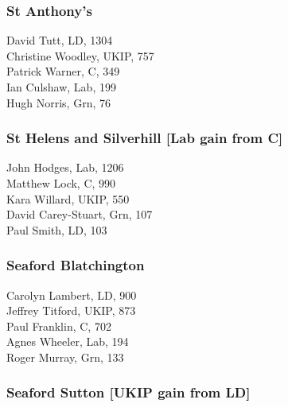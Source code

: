 \documentclass[a4paper,openany,10pt]{book}
\begin{document}
\subsubsection*{St Anthony's}



David Tutt, LD, 1304\\
Christine Woodley, UKIP, 757\\
Patrick Warner, C, 349\\
Ian Culshaw, Lab, 199\\
Hugh Norris, Grn, 76\\


\subsubsection*{St Helens and Silverhill \hspace*{\fill}\nolinebreak[1]%
\enspace\hspace*{\fill}
[Lab gain from C]}



John Hodges, Lab, 1206\\
Matthew Lock, C, 990\\
Kara Willard, UKIP, 550\\
David Carey-Stuart, Grn, 107\\
Paul Smith, LD, 103\\


\subsubsection*{Seaford Blatchington}



Carolyn Lambert, LD, 900\\
Jeffrey Titford, UKIP, 873\\
Paul Franklin, C, 702\\
Agnes Wheeler, Lab, 194\\
Roger Murray, Grn, 133\\


\subsubsection*{Seaford Sutton \hspace*{\fill}\nolinebreak[1]%
\enspace\hspace*{\fill}
[UKIP gain from LD]}
\end{document}

